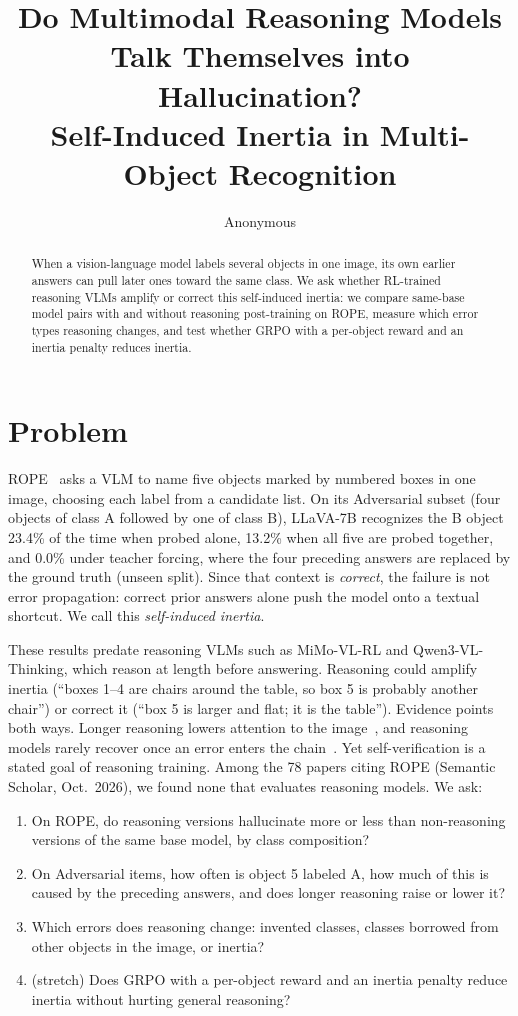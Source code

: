 \documentclass[11pt]{article}
\title{Do Multimodal Reasoning Models Talk Themselves into Hallucination?\\
Self-Induced Inertia in Multi-Object Recognition}
\author{Anonymous}
\begin{document}
\maketitle

\begin{abstract}
When a vision-language model labels several objects in one image, its own earlier answers can pull later ones toward the same class. We ask whether RL-trained reasoning VLMs amplify or correct this self-induced inertia: we compare same-base model pairs with and without reasoning post-training on ROPE, measure which error types reasoning changes, and test whether GRPO with a per-object reward and an inertia penalty reduces inertia.
\end{abstract}

\section{Problem}

ROPE~\citep{chen2024rope} asks a VLM to name five objects marked by numbered boxes in one image, choosing each label from a candidate list. On its Adversarial subset (four objects of class A followed by one of class B), LLaVA-7B recognizes the B object 23.4\% of the time when probed alone, 13.2\% when all five are probed together, and 0.0\% under teacher forcing, where the four preceding answers are replaced by the ground truth (unseen split). Since that context is \emph{correct}, the failure is not error propagation: correct prior answers alone push the model onto a textual shortcut. We call this \emph{self-induced inertia}.

These results predate reasoning VLMs such as MiMo-VL-RL and Qwen3-VL-Thinking, which reason at length before answering. Reasoning could amplify inertia (``boxes 1--4 are chairs around the table, so box 5 is probably another chair'') or correct it (``box 5 is larger and flat; it is the table''). Evidence points both ways. Longer reasoning lowers attention to the image~\citep{liu2025morethinking,tian2026vapo}, and reasoning models rarely recover once an error enters the chain~\citep{zhu2026textualinertia}. Yet self-verification is a stated goal of reasoning training. Among the 78 papers citing ROPE (Semantic Scholar, Oct.~2026), we found none that evaluates reasoning models. We ask:

\begin{enumerate}
\item[\textbf{RQ1}] On ROPE, do reasoning versions hallucinate more or less than non-reasoning versions of the same base model, by class composition?
\item[\textbf{RQ2}] On Adversarial items, how often is object 5 labeled A, how much of this is caused by the preceding answers, and does longer reasoning raise or lower it?
\item[\textbf{RQ3}] Which errors does reasoning change: invented classes, classes borrowed from other objects in the image, or inertia?
\item[\textbf{RQ4}] (stretch) Does GRPO with a per-object reward and an inertia penalty reduce inertia without hurting general reasoning?
\end{enumerate}
\end{document}
